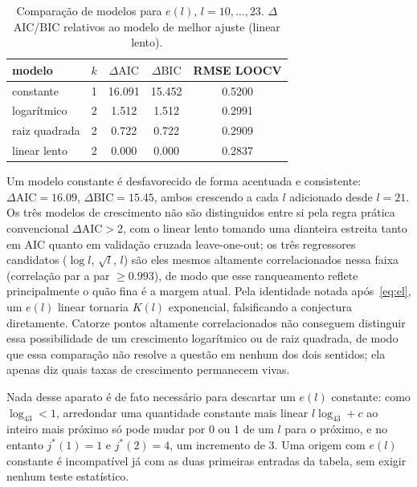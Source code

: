 \documentclass[11pt]{amsart}
\theoremstyle{plain}
\theoremstyle{definition}
\theoremstyle{remark}
\begin{document}
\begin{table}[h]
\centering
\begin{tabular}{l|c|c|c|c}
modelo & $k$ & $\Delta\mathrm{AIC}$ & $\Delta\mathrm{BIC}$ & RMSE LOOCV \\ \hline
constante & 1 & 16.091 & 15.452 & 0.5200 \\
logarítmico & 2 & 1.512 & 1.512 & 0.2991 \\
raiz quadrada & 2 & 0.722 & 0.722 & 0.2909 \\
linear lento & 2 & 0.000 & 0.000 & 0.2837
\end{tabular}
\caption{Comparação de modelos para $e(l)$, $l=10,\dots,23$. $\Delta$AIC/BIC relativos ao modelo de
melhor ajuste (linear lento).}
\label{tab:aic}
\end{table}

Um modelo constante é desfavorecido de forma acentuada e consistente: $\Delta\mathrm{AIC}=16.09$,
$\Delta\mathrm{BIC}=15.45$, ambos crescendo a cada $l$ adicionado desde $l=21$. Os três modelos de
crescimento não são distinguidos entre si pela regra prática convencional
$\Delta\mathrm{AIC}>2$, com o linear lento tomando uma dianteira estreita tanto em AIC quanto em
validação cruzada leave-one-out; os três regressores candidatos ($\log l$, $\sqrt l$, $l$) são eles
mesmos altamente correlacionados nessa faixa (correlação par a par $\ge0.993$), de modo que esse
ranqueamento reflete principalmente o quão fina é a margem atual. Pela identidade notada
após~\eqref{eq:el}, um $e(l)$ linear tornaria $K(l)$ exponencial, falsificando a conjectura
diretamente. Catorze pontos altamente correlacionados não conseguem distinguir essa possibilidade
de um crescimento logarítmico ou de raiz quadrada, de modo que essa comparação não resolve a
questão em nenhum dos dois sentidos; ela apenas diz quais taxas de crescimento permanecem vivas.

Nada desse aparato é de fato necessário para descartar um $e(l)$ constante: como $\log_43<1$,
arredondar uma quantidade constante mais linear $l\log_43+c$ ao inteiro mais próximo só pode mudar
por $0$ ou $1$ de um $l$ para o próximo, e no entanto $j^*(1)=1$ e $j^*(2)=4$, um incremento de
$3$. Uma origem com $e(l)$ constante é incompatível já com as duas primeiras entradas da tabela,
sem exigir nenhum teste estatístico.
\end{document}
